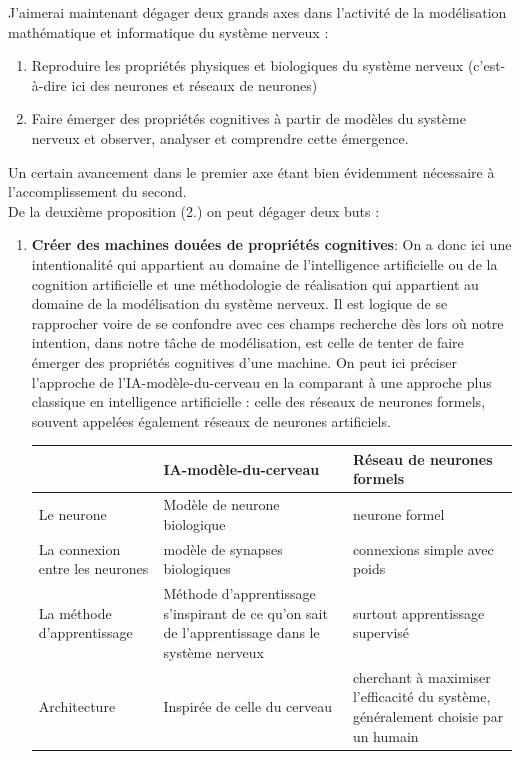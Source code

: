 \documentclass[12pt]{scrartcl}
\begin{document}
J'aimerai maintenant dégager deux grands axes dans l'activité de la modélisation mathématique et informatique du système nerveux :
\begin{enumerate} \item Reproduire les propriétés physiques et biologiques du système nerveux (c’est-à-dire ici des neurones et réseaux de neurones) 
\item Faire émerger des propriétés cognitives à partir de modèles du système nerveux et observer, analyser et comprendre cette émergence. \end{enumerate}
Un certain avancement dans le premier axe étant bien évidemment nécessaire à l'accomplissement du second. \\

De la deuxième proposition (2.) on peut dégager deux buts : 
\begin{enumerate} \item \textbf{Créer des machines douées de propriétés cognitives}: On a donc ici une intentionalité qui appartient au domaine de l'intelligence artificielle ou de la cognition artificielle et une méthodologie de réalisation qui appartient au domaine de la modélisation du système nerveux. Il est logique de se rapprocher voire de se confondre avec ces champs recherche dès lors où notre intention, dans notre tâche de modélisation, est celle de tenter de faire émerger des propriétés cognitives d'une machine. On peut ici préciser l'approche de l'IA-modèle-du-cerveau en la comparant à une approche plus classique en intelligence artificielle : celle des réseaux de neurones formels, souvent appelées également réseaux de neurones artificiels. \\ 

\begin{tabular}{|p{4cm}|p{5cm}|p{5cm}|} \hline&IA-modèle-du-cerveau & Réseau de neurones formels \\\hline Le neurone & Modèle de neurone biologique & neurone formel \\\hline La connexion entre les neurones & modèle de synapses biologiques & connexions simple avec poids \\\hline La méthode d'apprentissage & Méthode d'apprentissage s'inspirant de ce qu'on sait de l'apprentissage dans le système nerveux & surtout apprentissage supervisé \\\hline Architecture & Inspirée de celle du cerveau & cherchant à maximiser l'efficacité du système, généralement choisie par un humain \\\hline \end{tabular} \\ 


\end{enumerate}
\end{document}
